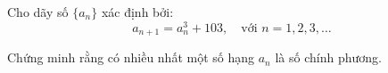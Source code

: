 \ifshowproblem
\begin{problem}\label{example:TWN-2015-TST2-Q2-P1}
    Cho dãy số \( \{a_n\} \) xác định bởi:
    \[
        a_{n+1} = a_n^3 + 103,\quad \text{với } n = 1, 2, 3, \dots
    \]
    
    Chứng minh rằng có nhiều nhất một số hạng \( a_n \) là số chính phương.
\end{problem}
\fi

\footnotemark
{}
\fi